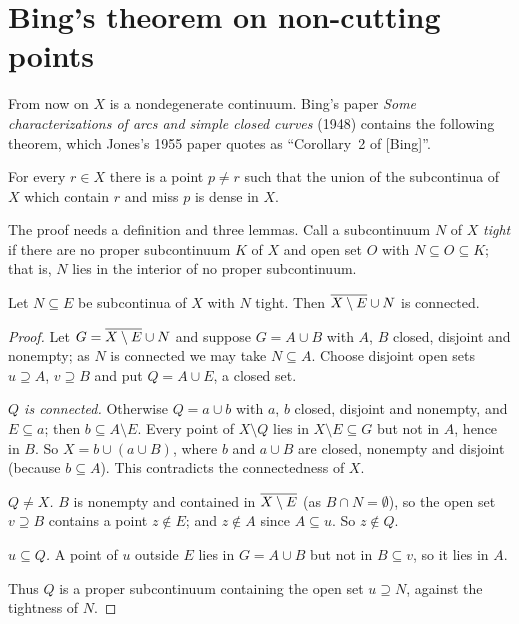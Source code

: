 \section{Bing's theorem on non-cutting points}\label{sec:bing5}

From now on $X$ is a nondegenerate continuum. Bing's paper \emph{Some characterizations of arcs and simple
closed curves} (1948) contains the following theorem, which Jones's 1955 paper quotes as
``Corollary~2 of [Bing]''.

\begin{theorem}\label{thm:bing5}
For every $r\in X$ there is a point $p\ne r$ such that the union of the subcontinua of $X$ which contain $r$
and miss $p$ is dense in $X$.
\end{theorem}

The proof needs a definition and three lemmas. Call a subcontinuum $N$ of $X$ \emph{tight} if there are no
proper subcontinuum $K$ of $X$ and open set $O$ with $N\subseteq O\subseteq K$; that is, $N$ lies in the interior of no
proper subcontinuum.

\begin{lemma}\label{lem:tight-conn}
Let $N\subseteq E$ be subcontinua of $X$ with $N$ tight. Then $\overline{X\setminus E}\cup N$ is connected.
\end{lemma}

\begin{proof}
Let $G=\overline{X\setminus E}\cup N$ and suppose $G=A\cup B$ with $A$, $B$ closed, disjoint and nonempty; as $N$ is
connected we may take $N\subseteq A$. Choose disjoint open sets $u\supseteq A$, $v\supseteq B$ and put $Q=A\cup E$, a closed set.

\emph{$Q$ is connected.} Otherwise $Q=a\cup b$ with $a$, $b$ closed, disjoint and nonempty, and $E\subseteq a$; then
$b\subseteq A\setminus E$. Every point of $X\setminus Q$ lies in $X\setminus E\subseteq G$ but not in $A$, hence in $B$. So
$X=b\cup(a\cup B)$, where $b$ and $a\cup B$ are closed, nonempty and disjoint (because $b\subseteq A$). This
contradicts the connectedness of $X$.

\emph{$Q\ne X$.} $B$ is nonempty and contained in $\overline{X\setminus E}$ (as $B\cap N=\emptyset$), so the open set $v\supseteq B$
contains a point $z\notin E$; and $z\notin A$ since $A\subseteq u$. So $z\notin Q$.

\emph{$u\subseteq Q$.} A point of $u$ outside $E$ lies in $G=A\cup B$ but not in $B\subseteq v$, so it lies in $A$.

Thus $Q$ is a proper subcontinuum containing the open set $u\supseteq N$, against the tightness of $N$.
\end{proof}

